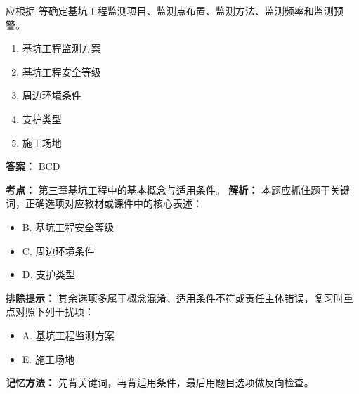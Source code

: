 \documentclass[UTF8,fontset=fandol,11pt]{ctexart}
\begin{document}
\begin{quizbox}[title={第 22 题}]
应根据 等确定基坑工程监测项目、监测点布置、监测方法、监测频率和监测预警。\\
\begin{enumerate}[label=\Alph*.]
\item 基坑工程监测方案
\item 基坑工程安全等级
\item 周边环境条件
\item 支护类型
\item 施工场地
\end{enumerate}
\textbf{答案：} BCD
\vspace{0.25em}
\begin{answerbox}[title={考点解析}]
\textbf{考点：} 第三章基坑工程中的基本概念与适用条件。
\textbf{解析：} 本题应抓住题干关键词，正确选项对应教材或课件中的核心表述：
\begin{itemize}
\item B. 基坑工程安全等级
\item C. 周边环境条件
\item D. 支护类型
\end{itemize}
\textbf{排除提示：} 其余选项多属于概念混淆、适用条件不符或责任主体错误，复习时重点对照下列干扰项：
\begin{itemize}
\item A. 基坑工程监测方案
\item E. 施工场地
\end{itemize}
\textbf{记忆方法：} 先背关键词，再背适用条件，最后用题目选项做反向检查。
\end{answerbox}
\end{quizbox}

\vspace{0.2em}
\end{document}
